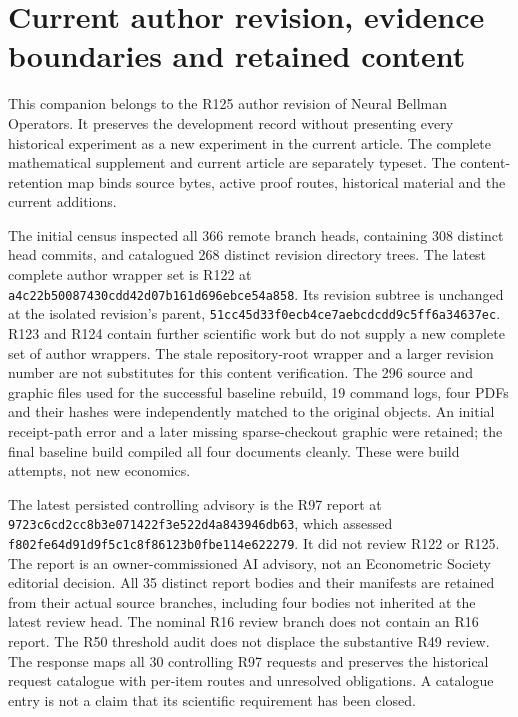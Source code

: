\section{Current author revision, evidence boundaries and retained content}
\label{dev:revision125}

This companion belongs to the R125 author revision of Neural Bellman
Operators. It preserves the development record without presenting every
historical experiment as a new experiment in the current article. The
complete mathematical supplement and current article are separately
typeset. The content-retention map binds source bytes, active proof routes,
historical material and the current additions.

The initial census inspected all 366 remote branch heads, containing 308
distinct head commits, and catalogued 268 distinct revision directory
trees. The latest complete author wrapper set is R122 at
\nolinkurl{a4c22b50087430cdd42d07b161d696ebce54a858}.
Its revision subtree is unchanged at the isolated revision's parent,
\nolinkurl{51cc45d33f0ecb4ce7aebcdcdd9c5ff6a34637ec}.
R123 and R124 contain further scientific work but do not supply a new
complete set of author wrappers. The stale repository-root wrapper and a
larger revision number are not substitutes for this content verification.
The 296 source and graphic files used for the successful baseline rebuild,
19 command logs, four PDFs and their hashes were independently matched to
the original objects. An initial receipt-path error and a later missing
sparse-checkout graphic were retained; the final baseline build compiled
all four documents cleanly. These were build attempts, not new economics.

The latest persisted controlling advisory is the R97 report at
\nolinkurl{9723c6cd2cc8b3e071422f3e522d4a843946db63}, which assessed
\nolinkurl{f802fe64d91d9f5c1c8f86123b0fbe114e622279}.
It did not review R122 or R125. The report is an owner-commissioned AI
advisory, not an Econometric Society editorial decision. All 35 distinct
report bodies and their manifests are retained from their actual source
branches, including four bodies not inherited at the latest review head.
The nominal R16 review branch does not contain an R16 report. The R50
threshold audit does not displace the substantive R49 review. The response
maps all 30 controlling R97 requests and preserves the historical request
catalogue with per-item routes and unresolved obligations. A catalogue
entry is not a claim that its scientific requirement has been closed.

